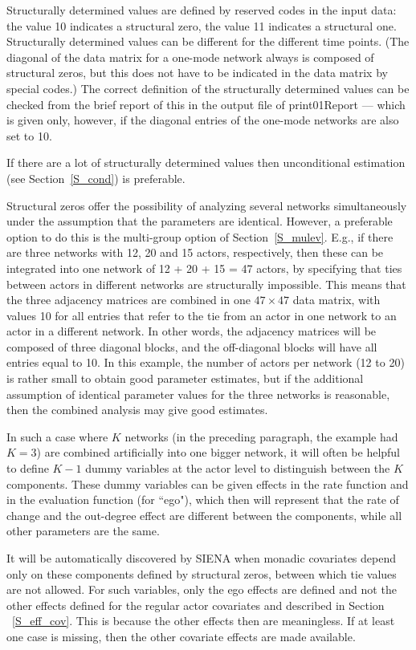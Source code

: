 \documentclass[a4paper,fleqn,11pt]{article}
\newcommand{\+}{\, + \,}
\newcommand{\sfn}[1]{\textsf{#1}}
\newcommand{\SI}{{\sf SIENA }}
\begin{document}
Structurally determined values are defined by reserved codes in
the input data: the value 10 indicates a structural zero, the
value 11 indicates a structural one. Structurally determined
values can be different for the different time points. (The
diagonal of the data matrix for a one-mode network
always is composed of structural
zeros, but this does not have to be indicated in the data matrix
by special codes.) The correct definition of the structurally
determined values can be checked from the brief report of this in
the output file of \sfn{print01Report} --- which is given only,
however, if the diagonal entries of the one-mode networks are also
set to 10.

If there are a lot of structurally determined values
then unconditional estimation  (see Section~\ref{S_cond})
is preferable.

Structural zeros offer the possibility of analyzing several
networks simultaneously under the assumption that the parameters
are identical.
However, a preferable option to do this is
the multi-group option of Section~\ref{S_mulev}.
E.g., if there are three networks with 12, 20 and
15 actors, respectively, then these can be integrated into one
network of 12 + 20 + 15 = 47 actors, by specifying that ties
between actors in different networks are structurally impossible.
This means that the three adjacency matrices are combined in one
$47 \times 47$ data matrix, with values 10 for all entries that
refer to the tie from an actor in one network to an actor in a
different network. In other words, the adjacency matrices will be
composed of three diagonal blocks, and the off-diagonal blocks
will have all entries equal to 10. In this example, the number of
actors per network (12 to 20) is rather small to obtain good
parameter estimates, but if the additional assumption of identical
parameter values for the three networks is reasonable, then the
combined analysis may give good estimates.

In such a case where $K$ networks (in the preceding paragraph, the
example had $K = 3$) are combined artificially into one bigger
network, it will often be helpful to define $K-1$ dummy variables
at the actor level to distinguish between the $K$ components.
These dummy variables can be given effects in the rate function
and in the evaluation function (for ``ego"), which then will
represent that the rate of change and the out-degree effect are
different between the components, while all other parameters are
the same.

It will be automatically discovered by \SI when monadic covariates
depend only on these components defined by structural zeros,
between which tie values are not allowed.
For such variables, only the ego effects are defined
and not the other effects defined for the regular
actor covariates and described in Section ~\ref{S_eff_cov}.
This is because the other effects then are meaningless.
If at least one case is missing,
then the other covariate effects are made available.
\end{document}

